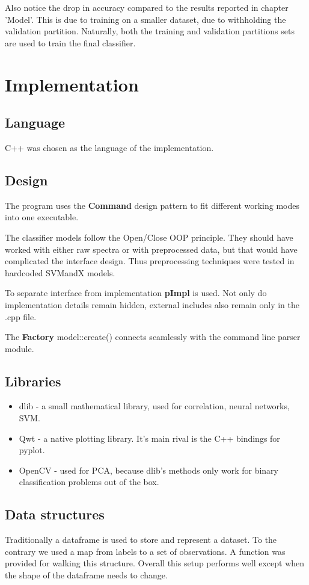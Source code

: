 \documentclass{article}
\begin{document}
Also notice the drop in accuracy compared to the results reported in chapter 'Model'.
This is due to training on a smaller dataset, due to withholding the validation partition.
Naturally, both the training and validation partitions sets are used to train the final classifier.


\section{Implementation}
\subsection{Language}
C++ was chosen as the language of the implementation.


\subsection{Design}
The program uses the \textbf{Command} design pattern to fit different working modes into one executable.

The classifier models follow the Open/Close OOP principle.
They should have worked with either raw spectra or with preprocessed data, but that would have complicated the interface design.
Thus preprocessing techniques were tested in hardcoded SVMandX models.

To separate interface from implementation \textbf{pImpl} is used.
Not only do implementation details remain hidden, external includes also remain only in the .cpp file.

The \textbf{Factory} model::create() connects seamlessly with the command line parser module.

\subsection{Libraries}
\begin{itemize}
\item{dlib - a small mathematical library, used for correlation, neural networks, SVM.}
\item{Qwt - a native plotting library. It's main rival is the C++ bindings for pyplot.}
\item{OpenCV - used for PCA, because dlib's methods only work for binary classification problems out of the box.}
\end{itemize}

\subsection{Data structures}
Traditionally a dataframe is used to store and represent a dataset.
To the contrary we used a map from labels to a set of observations.
A function was provided for walking this structure.
Overall this setup performs well except when the shape of the dataframe needs to change.
\end{document}
